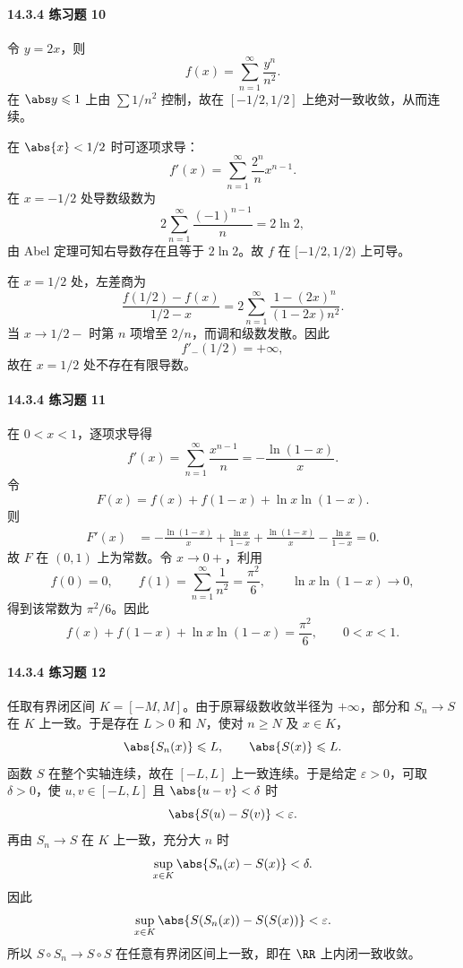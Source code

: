 \paragraph{14.3.4 练习题 10}
\begin{xsolution}
令 $y=2x$，则
\[
  f(x)=\sum_{n=1}^{\infty}\frac{y^n}{n^2}.
\]
在 $\abs y\leqslant1$ 上由 $\sum1/n^2$ 控制，故在 $[-1/2,1/2]$ 上绝对一致收敛，从而连续。

在 $\abs{x}<1/2$ 时可逐项求导：
\[
  f'(x)=\sum_{n=1}^{\infty}\frac{2^n}{n}x^{n-1}.
\]
在 $x=-1/2$ 处导数级数为
\[
  2\sum_{n=1}^{\infty}\frac{(-1)^{n-1}}n=2\ln2,
\]
由 Abel 定理可知右导数存在且等于 $2\ln2$。故 $f$ 在 $[-1/2,1/2)$ 上可导。

在 $x=1/2$ 处，左差商为
\[
  \frac{f(1/2)-f(x)}{1/2-x}
  =2\sum_{n=1}^{\infty}\frac{1-(2x)^n}{(1-2x)n^2}.
\]
当 $x\to1/2-$ 时第 $n$ 项增至 $2/n$，而调和级数发散。因此
\[
  f'_-(1/2)=+\infty,
\]
故在 $x=1/2$ 处不存在有限导数。
\end{xsolution}

\paragraph{14.3.4 练习题 11}
\begin{xsolution}
在 $0<x<1$，逐项求导得
\[
  f'(x)=\sum_{n=1}^{\infty}\frac{x^{n-1}}n
  =-\frac{\ln(1-x)}x.
\]
令
\[
  F(x)=f(x)+f(1-x)+\ln x\ln(1-x).
\]
则
\[
\begin{aligned}
  F'(x)
  &=-\frac{\ln(1-x)}x
  +\frac{\ln x}{1-x}
  +\frac{\ln(1-x)}x-\frac{\ln x}{1-x}=0.
\end{aligned}
\]
故 $F$ 在 $(0,1)$ 上为常数。令 $x\to0+$，利用
\[
  f(0)=0,\qquad f(1)=\sum_{n=1}^{\infty}\frac1{n^2}=\frac{\pi^2}{6},
  \qquad \ln x\ln(1-x)\to0,
\]
得到该常数为 $\pi^2/6$。因此
\[
  \boxed{f(x)+f(1-x)+\ln x\ln(1-x)=\frac{\pi^2}{6}},
  \qquad0<x<1.
\]
\end{xsolution}

\paragraph{14.3.4 练习题 12}
\begin{xsolution}
任取有界闭区间 $K=[-M,M]$。由于原幂级数收敛半径为 $+\infty$，部分和 $S_n\to S$ 在 $K$ 上一致。于是存在 $L>0$ 和 $N$，使对 $n\geqslant N$ 及 $x\in K$，
\[
  \abs{S_n(x)}\leqslant L,
  \qquad \abs{S(x)}\leqslant L.
\]
函数 $S$ 在整个实轴连续，故在 $[-L,L]$ 上一致连续。于是给定 $\varepsilon>0$，可取 $\delta>0$，使 $u,v\in[-L,L]$ 且 $\abs{u-v}<\delta$ 时
\[
  \abs{S(u)-S(v)}<\varepsilon.
\]
再由 $S_n\to S$ 在 $K$ 上一致，充分大 $n$ 时
\[
  \sup_{x\in K}\abs{S_n(x)-S(x)}<\delta.
\]
因此
\[
  \sup_{x\in K}\abs{S(S_n(x))-S(S(x))}<\varepsilon.
\]
所以 $S\circ S_n\to S\circ S$ 在任意有界闭区间上一致，即在 $\RR$ 上内闭一致收敛。
\end{xsolution}

